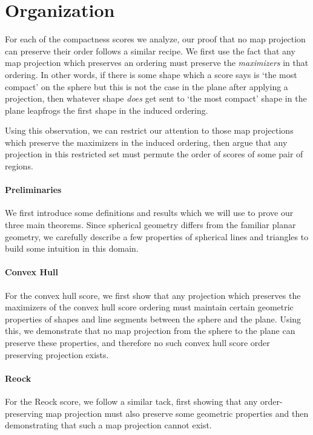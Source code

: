 \section{Organization}


For each of the compactness scores we analyze, our proof that no map
projection can preserve their order follows a similar recipe. We
first use the fact that any map projection which preserves an ordering
must preserve the \textit{maximizers} in that ordering.  In other words,
if there is some shape which a score says is `the most compact' on the sphere 
but this is not the case in the plane after applying a projection, then whatever 
shape \textit{does} get sent to `the most compact' shape in the plane leapfrogs 
the first shape in the induced ordering.

Using this observation, we can restrict our attention to those map
projections which preserve the maximizers in the induced ordering,
then argue that any projection in this restricted set must permute the
order of scores of some pair of regions.


\paragraph{Preliminaries}
We first introduce some definitions and results which we will use to prove our 
three main theorems.  Since spherical geometry differs from the familiar planar geometry, 
we carefully describe a few properties of spherical lines and triangles to build some intuition 
in this domain. 


\paragraph{Convex Hull}
For the convex hull score, we first 
show that any projection which preserves the maximizers of the convex hull score 
ordering must maintain certain geometric properties of shapes and line segments 
between the sphere and the plane.  Using this, we demonstrate that no 
map projection from the sphere to the plane can preserve these properties, and therefore 
no such convex hull score order preserving projection exists.



\paragraph{Reock}
For the Reock score, we follow a similar tack, first showing that any 
order-preserving map projection must also preserve some geometric properties 
and then demonstrating that such a map projection cannot exist.





